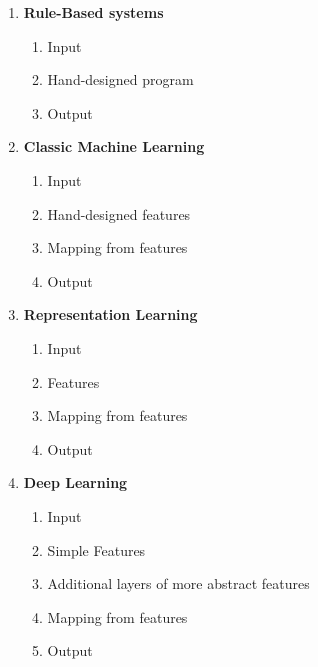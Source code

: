 \begin{enumerate}[itemsep=0.2cm]
    \item \textbf{Rule-Based systems}
    \begin{enumerate}
        \item Input
        \item Hand-designed program
        \item Output
    \end{enumerate}

    \item \textbf{Classic Machine Learning}
    \begin{enumerate}
        \item Input
        \item Hand-designed features
        \item Mapping from features
        \item Output
    \end{enumerate}

    \item \textbf{Representation Learning}
    \begin{enumerate}
        \item Input
        \item Features
        \item Mapping from features
        \item Output
    \end{enumerate}

    \item \textbf{Deep Learning}
    \begin{enumerate}
        \item Input
        \item Simple Features
        \item Additional layers of more abstract features
        \item Mapping from features
        \item Output
    \end{enumerate}
\end{enumerate}
































